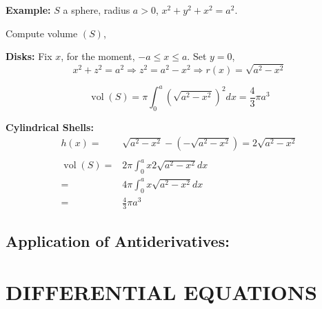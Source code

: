 \documentclass[12pt]{article}
\theoremstyle{plain}
\DeclareMathOperator{\Vol}{vol}
\begin{document}
{\color{Brown}
	\textbf{Example: }
	$S$ a sphere, radius $a > 0$, $x^2+y^2+x^2 = a^2$. 

	Compute volume $(S)$, 

	\textbf{Disks: }
	Fix $x$, for the moment, $-a \leq x \leq a$. Set $y =0$, 
	\[
		x^2+z^2 = a^2 \Rightarrow z^2=a^2-x^2 \Rightarrow r(x) = \sqrt{a^2-x^2}
	\]

	\[
		\Vol(S) = \pi \int_0^a (\sqrt{a^2-x^2})^2dx = \frac 43 \pi a^3
	\]
	
	\textbf{Cylindrical Shells: }
	\begin{align*}
		h(x) =& \sqrt{a^2-x^2}-(-\sqrt{a^2-x^2}) = 2\sqrt{a^2-x^2}\\\\
		\Vol(S) =& 2\pi \int_0^a x 2\sqrt{a^2-x^2}dx \\
		=& 4\pi \int_0^a x\sqrt{a^2-x^2}dx \\
		=& \frac 43 \pi a^3
	\end{align*}

}

\newpage
	\subsection{Application of Antiderivatives: }






\section{DIFFERENTIAL EQUATIONS}
\end{document}
